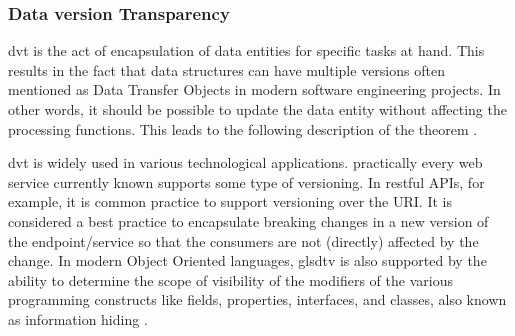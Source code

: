 \subsubsection{Data version Transparency}

\gls{dvt} is the act of encapsulation of data entities for specific tasks at hand. This
results in the fact that data structures can have multiple versions often mentioned as
Data Transfer Objects in modern software engineering projects. In other words, it should
be possible to update the data entity without affecting the processing functions. This
leads to the following description of the theorem \parencite[280]{mannaert_normalized_2016}.


\gls{dvt} is widely used in various technological applications. practically every web
service currently known supports some type of versioning. In restful APIs, for example, it
is common practice to support versioning over the URI. It is considered a best practice to
encapsulate breaking changes in a new version of the endpoint/service so that the
consumers are not (directly) affected by the change. In modern Object Oriented languages,
gls{dtv} is also supported by the ability to determine the scope of visibility of the
modifiers of the various programming constructs like fields, properties, interfaces, and
classes, also known as information hiding
\parencites{parnas_criteria_1972}[278]{mannaert_normalized_2016}.